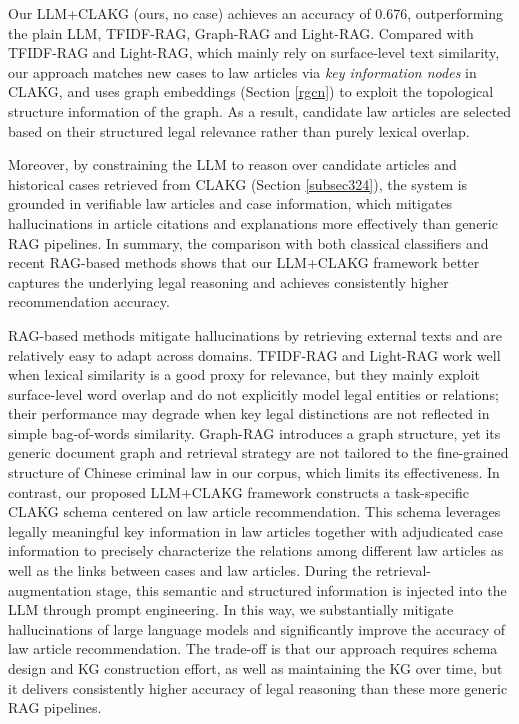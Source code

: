 \documentclass[review,times,nonatbib]{elsarticle} %
\renewcommand{\textcolor}[2]{#2}
\begin{document}
Our LLM+CLAKG (ours, no case) achieves an accuracy of 0.676, outperforming the plain LLM, TFIDF-RAG, Graph-RAG and Light-RAG. Compared with TFIDF-RAG and Light-RAG, which mainly rely on surface-level text similarity, our approach matches new cases to law articles via \emph{key information nodes} in CLAKG, and uses graph embeddings (Section \ref{rgcn}) to exploit the topological structure information of the graph. As a result, candidate law articles are selected based on their structured legal relevance rather than purely lexical overlap.

Moreover, by constraining the LLM to reason over candidate articles and historical cases retrieved from CLAKG (Section \ref{subsec324}), the system is grounded in verifiable law articles and case information, which mitigates hallucinations in article citations and explanations more effectively than generic RAG pipelines. In summary, the comparison with both classical classifiers and recent RAG-based methods shows that our LLM+CLAKG framework better captures the underlying legal reasoning and achieves consistently higher recommendation accuracy.

\textcolor{blue}{RAG-based methods mitigate hallucinations by retrieving external texts and are relatively easy to adapt across domains. TFIDF-RAG and Light-RAG work well when lexical similarity is a good proxy for relevance, but they mainly exploit surface-level word overlap and do not explicitly model legal entities or relations; their performance may degrade when key legal distinctions are not reflected in simple bag-of-words similarity. Graph-RAG introduces a graph structure, yet its generic document graph and retrieval strategy are not tailored to the fine-grained structure of Chinese criminal law in our corpus, which limits its effectiveness. In contrast, our proposed LLM+CLAKG framework constructs a task-specific CLAKG schema centered on law article recommendation. This schema leverages legally meaningful key information in law articles together with adjudicated case information to precisely characterize the relations among different law articles as well as the links between cases and law articles. During the retrieval-augmentation stage, this semantic and structured information is injected into the LLM through prompt engineering. In this way, we substantially mitigate hallucinations of large language models and significantly improve the accuracy of law article recommendation. The trade-off is that our approach requires schema design and KG construction effort, as well as maintaining the KG over time, but it delivers consistently higher accuracy of legal reasoning than these more generic RAG pipelines.}
\end{document}
